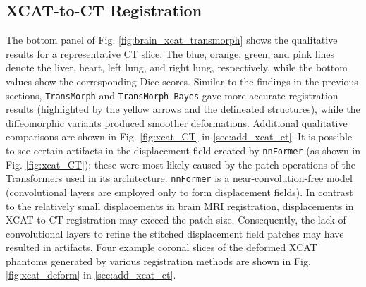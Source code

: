 \documentclass[times,twocolumn,final]{elsarticle}
\begin{document}
\subsection{XCAT-to-CT Registration}
The bottom panel of Fig. \ref{fig:brain_xcat_transmorph} shows the qualitative results for a representative CT slice. The blue, orange, green, and pink lines denote the liver, heart, left lung, and right lung, respectively, while the bottom values show the corresponding Dice scores. Similar to the findings in the previous sections, \texttt{TransMorph} and \texttt{TransMorph-Bayes} gave more accurate registration results (highlighted by the yellow arrows and the delineated structures), while the diffeomorphic variants produced smoother deformations. Additional qualitative comparisons are shown in Fig. \ref{fig:xcat_CT} in \ref{sec:add_xcat_ct}. It is possible to see certain artifacts in the displacement field created by \texttt{nnFormer} (as shown in Fig. \ref{fig:xcat_CT}); these were most likely caused by the patch operations of the Transformers used in its architecture. \texttt{nnFormer} is a near-convolution-free model (convolutional layers are employed only to form displacement fields). In contrast to the relatively small displacements in brain MRI registration, displacements in XCAT-to-CT registration may exceed the patch size. Consequently, the lack of convolutional layers to refine the stitched displacement field patches may have resulted in artifacts. Four example coronal slices of the deformed XCAT phantoms generated by various registration methods are shown in Fig. \ref{fig:xcat_deform} in \ref{sec:add_xcat_ct}.
\end{document}
